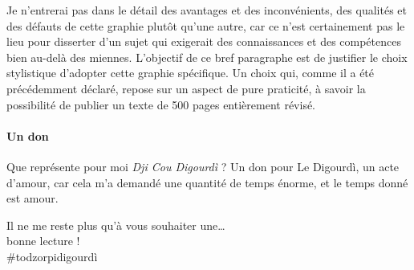 Je n'entrerai pas dans le détail des avantages et des inconvénients, des qualités et des défauts de cette graphie plutôt qu'une autre, car ce n'est certainement pas le lieu pour disserter d'un sujet qui exigerait des connaissances et des compétences bien au-delà des miennes. L'objectif de ce bref paragraphe est de justifier le choix stylistique d'adopter cette graphie spécifique. Un choix qui, comme il a été précédemment déclaré, repose sur un aspect de pure praticité, à savoir la possibilité de publier un texte de 500 pages entièrement révisé.

\paragraph*{Un don}
Que représente pour moi \textit{Dji Cou Digourdì} ? Un don pour Le Digourdì, un acte d'amour, car cela m'a demandé une quantité de temps énorme, et le temps donné est amour.
\newpage
\begin{center}
Il ne me reste plus qu'à vous souhaiter une\ldots\\\vfill bonne lecture !\\\vfill\#todzorpidigourdì
\end{center}


